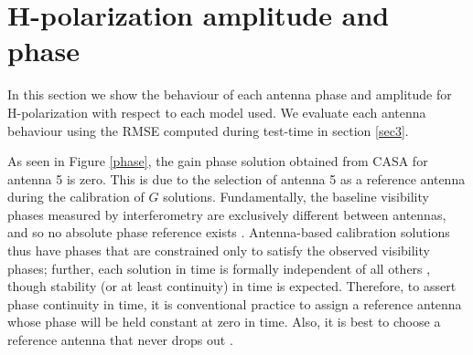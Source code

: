 \section{H-polarization amplitude and phase}
\label{Hp}
In this section we show the behaviour of each antenna phase and amplitude for H-polarization  with respect to each model used. We evaluate each antenna behaviour using the RMSE computed during test-time in section \ref{sec3}.   

As seen in Figure \ref{phase}, the gain phase solution obtained from CASA for antenna 5 is zero. This is due to the selection of antenna 5 as a reference antenna during the calibration of $G$ solutions. Fundamentally, the baseline visibility phases measured by interferometry are exclusively different between antennas, and so no absolute phase reference exists \citep{taylor1999synthesis}. Antenna-based calibration solutions thus have phases that are constrained only to satisfy the observed visibility phases; further, each solution in time is formally independent of all others \citep{taylor1999synthesis}, though stability (or at least continuity) in time is expected. Therefore, to assert phase continuity in time, it is conventional practice to assign a reference antenna whose phase will be held constant at zero in time. Also, it is best to choose a reference antenna that never drops out \citep{editioncasa}. 

